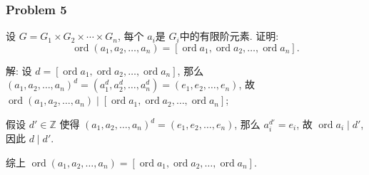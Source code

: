 \documentclass[a4paper,12pt]{ctexart}
\newcommand{\Z}{\mathbb{Z}}
\newcommand{\ord}{\operatorname{ord}}
\begin{document}
\subsubsection*{Problem 5}
  设 $ G=G_1\times G_2\times\cdots\times G_n $, 每个 $ a_i $是 $ G_i $中的有限阶元素. 证明: 
  \[\operatorname{ord}(a_1,a_2,\dots,a_n)=[\operatorname{ord}a_1,\operatorname{ord}a_2,\dots,\operatorname{ord}a_n].\]

  解: 设 $ d=[\operatorname{ord}a_1,\operatorname{ord}a_2,\dots,\operatorname{ord}a_n] $, 那么 $ (a_1,a_2,\dots,a_n)^d=(a_1^d,a_2^d,\dots,a_n^d)=(e_1,e_2,\dots,e_n) $, 故 $ \operatorname{ord}(a_1,a_2,\dots,a_n)\mid [\operatorname{ord}a_1,\operatorname{ord}a_2,\dots,\operatorname{ord}a_n] $;

  假设 $ d'\in \Z $ 使得 $ (a_1,a_2,\dots,a_n)^d=(e_1,e_2,\dots,e_n) $, 那么 $ a_i^{d'}=e_i $, 故 $ \ord a_i\mid d' $, 因此
  $ d\mid d' $.

  综上 $ \operatorname{ord}(a_1,a_2,\dots,a_n)=[\operatorname{ord}a_1,\operatorname{ord}a_2,\dots,\operatorname{ord}a_n] $.
\end{document}
